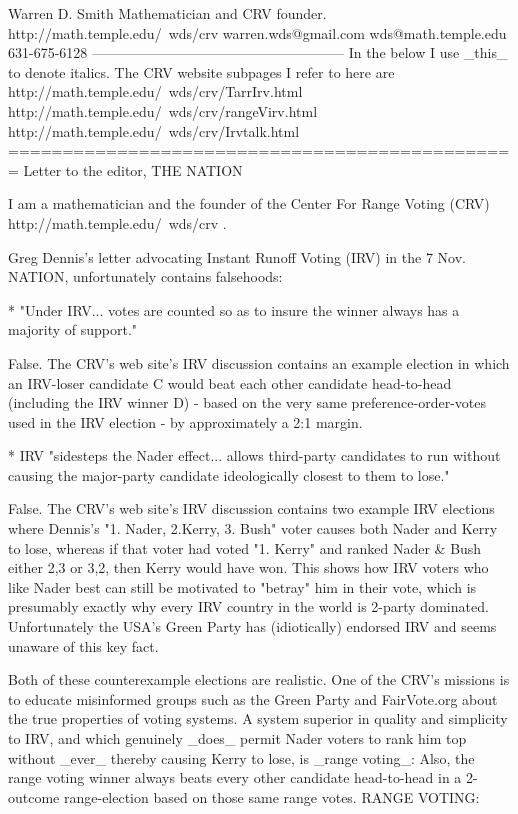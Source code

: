 Warren D. Smith
Mathematician and CRV founder.
http://math.temple.edu/~wds/crv
warren.wds@gmail.com
wds@math.temple.edu
631-675-6128
------------------------------------------------------
In the below I use _this_ to denote italics.
The CRV website subpages I refer to here are
http://math.temple.edu/~wds/crv/TarrIrv.html
http://math.temple.edu/~wds/crv/rangeVirv.html
http://math.temple.edu/~wds/crv/Irvtalk.html
===============================================
Letter to the editor, THE NATION

I am a mathematician and the founder of the
Center For Range Voting (CRV)
http://math.temple.edu/~wds/crv .

Greg Dennis's letter advocating Instant Runoff
Voting (IRV) in the 7 Nov. NATION, unfortunately
contains falsehoods:

* "Under IRV... votes are counted so as to insure the winner always has a
majority of support."

False. The CRV's web site's IRV discussion
contains an example election in which an
IRV-loser candidate C would beat each other candidate head-to-head
(including the
IRV winner D) - based on the very same preference-order-votes used in the
IRV election - by approximately a 2:1 margin.

* IRV "sidesteps the Nader effect... allows
third-party candidates to run without causing
the major-party candidate ideologically closest
to them to lose."

False. The CRV's web site's IRV discussion
contains two example IRV elections where Dennis's
"1. Nader, 2.Kerry, 3. Bush" voter causes both
Nader and Kerry to lose, whereas if that
voter had voted "1. Kerry" and ranked Nader & Bush either 2,3 or 3,2, then
Kerry would have won. This shows how IRV voters who like Nader
best can still be motivated to "betray" him
in their vote, which is presumably exactly
why every IRV country in the world
is 2-party dominated. Unfortunately the
USA's Green Party has (idiotically) endorsed
IRV and seems unaware of this key fact.

Both of these counterexample elections are realistic.
One of the CRV's missions is to educate
misinformed groups such as the Green Party
and FairVote.org about the true properties
of voting systems. A system superior
in quality and simplicity to IRV, and
which genuinely _does_ permit Nader voters
to rank him top without _ever_ thereby
causing Kerry to lose, is _range voting_:
Also, the range voting winner always beats
every other candidate head-to-head in a
2-outcome range-election based on those
same range votes. RANGE VOTING:


